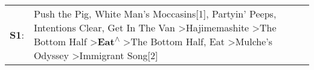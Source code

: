 \begin{supertabular}{p{0.03\textwidth}p{0.92\textwidth}}
 \textbf{S1}:  &  Push the Pig\textsuperscript{}, \enspace White Man's Moccasins[1]\textsuperscript{}, \enspace Partyin' Peeps\textsuperscript{}, \enspace Intentions Clear\textsuperscript{}, \enspace Get In The Van\textsuperscript{} \textgreater \enspace Hajimemashite\textsuperscript{} \textgreater \enspace The Bottom Half\textsuperscript{} \textgreater \enspace \textbf{Eat\textsuperscript{$\wedge$}} \textgreater \enspace The Bottom Half\textsuperscript{}, \enspace Eat\textsuperscript{} \textgreater \enspace Mulche's Odyssey\textsuperscript{} \textgreater \enspace Immigrant Song[2]\textsuperscript{}  \enspace  \\
\end{supertabular}
